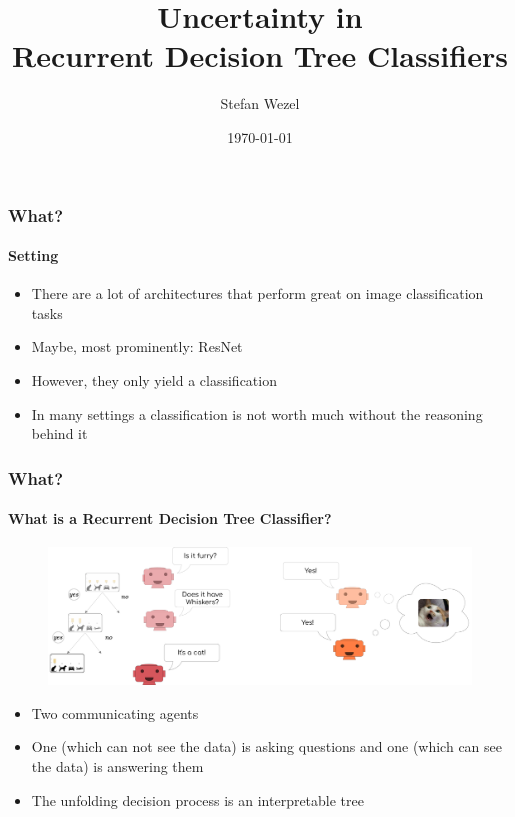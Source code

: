 \documentclass[9pt]{beamer}
\title{Uncertainty in\\Recurrent Decision Tree Classifiers}
\author{Stefan Wezel}
\institute{Explainable Machine Learning}
\date{\today}
\begin{document}
\begin{frame}[plain]
	\titlepage
\end{frame} 

\begin{frame}
\frametitle{What?}
\framesubtitle{Setting}
	\begin{itemize}\setlength\itemsep{1em}
	\item There are a lot of architectures that perform great on image classification tasks
	\item Maybe, most prominently: ResNet
	\item However, they only yield a classification
	\item In many settings a classification is not worth much without the reasoning behind it
	\end{itemize}
\end{frame} 


\begin{frame}
\frametitle{What?}
\framesubtitle{What is a Recurrent Decision Tree Classifier?}
	\begin{figure}
	\centering
	\includegraphics[width=1\textwidth]{images/rdtc_intuition.pdf}
\end{figure}
\begin{itemize}\setlength\itemsep{1em}
	\item Two communicating agents
	\item One (which can not see the data) is asking questions and one (which can see the data) is answering them
	\item The unfolding decision process is an interpretable tree
\end{itemize}
\end{frame} 
\end{document}
